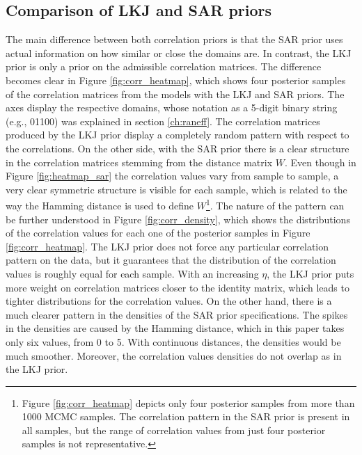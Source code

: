 \subsection{Comparison of LKJ and SAR priors}
\label{ch:comparison_lkj_sar}
The main difference between both correlation priors is that the SAR prior uses actual information on how similar or close the domains are.
In contrast, the LKJ prior is only a prior on the admissible correlation matrices.
The difference becomes clear in Figure \ref{fig:corr_heatmap}, which shows four posterior samples of the correlation matrices from the models with the LKJ and SAR priors.
The axes display the respective domains, whose notation as a 5-digit binary string (e.g., 01100) was explained in section \ref{ch:raneff}.
The correlation matrices produced by the LKJ prior display a completely random pattern with respect to the correlations.
On the other side, with the SAR prior there is a clear structure in the correlation matrices stemming from the distance matrix $W$.
Even though in Figure \ref{fig:heatmap_sar} the correlation values vary from sample to sample, a very clear symmetric structure is visible for each sample, which is related to the way the Hamming distance is used to define $W$\footnote{Figure \ref{fig:corr_heatmap} depicts only four posterior samples from more than 1000 MCMC samples. The correlation pattern in the SAR prior is present in all samples, but the range of correlation values from just four posterior samples is not representative.}.
The nature of the pattern can be further understood in Figure \ref{fig:corr_density}, which shows the distributions of the correlation values for each one of the posterior samples in Figure \ref{fig:corr_heatmap}.
The LKJ prior does not force any particular correlation pattern on the data, but it guarantees that the distribution of the correlation values is roughly equal for each sample.
With an increasing $\eta$, the LKJ prior puts more weight on correlation matrices closer to the identity matrix, which leads to tighter distributions for the correlation values.
On the other hand, there is a much clearer pattern in the densities of the SAR prior specifications.
The spikes in the densities are caused by the Hamming distance, which in this paper takes only six values, from 0 to 5.
With continuous distances, the densities would be much smoother.
Moreover, the correlation values densities do not overlap as in the LKJ prior.

